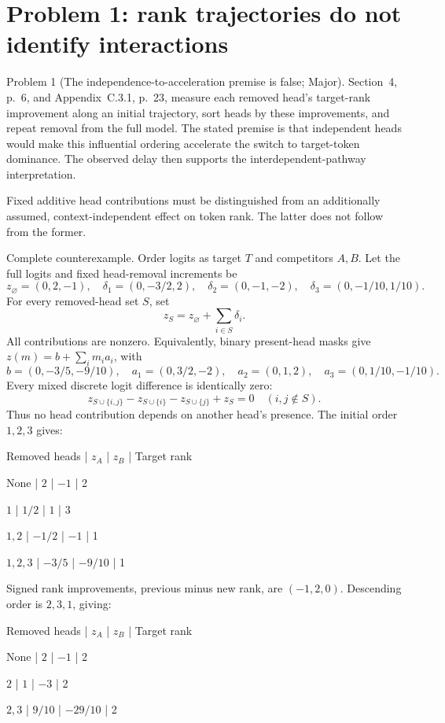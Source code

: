 \documentclass[10pt]{article}
\begin{document}
\section*{Problem 1: rank trajectories do not identify interactions}
Problem 1 (The independence-to-acceleration premise is false; Major).  Section 4, p. 6, and Appendix C.3.1, p. 23, measure each removed head’s target-rank improvement along an initial trajectory, sort heads by these improvements, and repeat removal from the full model. The stated premise is that independent heads would make this influential ordering accelerate the switch to target-token dominance. The observed delay then supports the interdependent-pathway interpretation.\par
Fixed additive head contributions must be distinguished from an additionally assumed, context-independent effect on token rank. The latter does not follow from the former.\par
Complete counterexample. Order logits as target \(T\) and competitors \(A,B\). Let the full logits and fixed head-removal increments be \[z_\varnothing=(0,2,-1),\quad
 \delta_1=(0,-3/2,2),\quad
 \delta_2=(0,-1,-2),\quad
 \delta_3=(0,-1/10,1/10).\] For every removed-head set \(S\), set \[z_S=z_\varnothing+\sum_{i\in S}\delta_i.\] All contributions are nonzero. Equivalently, binary present-head masks give \(z(m)=b+\sum_i m_i a_i\), with \[b=(0,-3/5,-9/10),\quad
 a_1=(0,3/2,-2),\quad a_2=(0,1,2),\quad a_3=(0,1/10,-1/10).\] Every mixed discrete logit difference is identically zero: \[z_{S\cup\{i,j\}}-z_{S\cup\{i\}}-z_{S\cup\{j\}}+z_S=0
 \quad(i,j\notin S).\] Thus no head contribution depends on another head’s presence. The initial order \(1,2,3\) gives:\par
Removed heads | \(z_A\) | \(z_B\) | Target rank\par
None | \(2\) | \(-1\) | 2\par
\(1\) | \(1/2\) | \(1\) | 3\par
\(1,2\) | \(-1/2\) | \(-1\) | 1\par
\(1,2,3\) | \(-3/5\) | \(-9/10\) | 1\par
Signed rank improvements, previous minus new rank, are \((-1,2,0)\). Descending order is \(2,3,1\), giving:\par
Removed heads | \(z_A\) | \(z_B\) | Target rank\par
None | \(2\) | \(-1\) | 2\par
\(2\) | \(1\) | \(-3\) | 2\par
\(2,3\) | \(9/10\) | \(-29/10\) | 2\par
\end{document}

